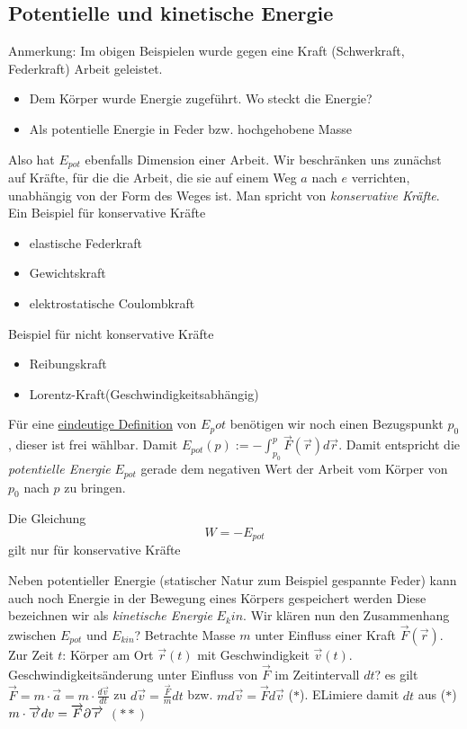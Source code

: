 \documentclass[a4paper,10pt]{scrartcl}
\begin{document}
\subsection{Potentielle und kinetische Energie}
Anmerkung: Im obigen Beispielen wurde gegen eine Kraft (Schwerkraft, Federkraft) Arbeit geleistet.
\begin{itemize}
 \item Dem Körper wurde Energie zugeführt. Wo steckt die Energie?
 \item Als potentielle Energie in Feder bzw. hochgehobene Masse
\end{itemize}
Also hat $E_{pot}$ ebenfalls Dimension einer Arbeit. Wir beschränken uns zunächst auf Kräfte, für die die Arbeit, die sie auf einem Weg $a$ nach $e$ verrichten, 
unabhängig von der Form des Weges ist. Man spricht von \emph{konservative Kräfte}.\\
Ein Beispiel für konservative Kräfte\\
\begin{itemize}
 \item elastische Federkraft
 \item Gewichtskraft
 \item elektrostatische Coulombkraft
\end{itemize}
Beispiel für nicht  konservative Kräfte\\
\begin{itemize}
 \item Reibungskraft
 \item Lorentz-Kraft(Geschwindigkeitsabhängig)
\end{itemize}
Für eine \underline{eindeutige Definition} von $E_pot$ benötigen wir noch einen Bezugspunkt $p_0$, dieser ist frei wählbar.
Damit $E_{pot}(p):= -\int_{p_0}^{p} \vec F(\vec r)d\vec{r}$.
Damit entspricht die \emph{potentielle Energie} $E_{pot}$ gerade dem negativen Wert der Arbeit vom Körper von $p_0$ nach $p$ zu bringen.
\begin{att*}
 Die Gleichung
\[
 \boxed{W=-E_{pot}}
\]
gilt nur für konservative Kräfte
\end{att*}
Neben potentieller Energie (statischer Natur zum Beispiel gespannte Feder) kann auch noch Energie in der Bewegung eines Körpers gespeichert werden
Diese bezeichnen wir als \emph{kinetische Energie} $E_kin$. Wir klären nun den Zusammenhang zwischen $E_{pot}$ und $E_{kin}$?
Betrachte Masse $m$ unter Einfluss einer Kraft $\vec F(\vec r)$.\\
Zur Zeit $t$: Körper am Ort $\vec r(t)$ mit Geschwindigkeit $\vec v(t)$.
Geschwindigkeitsänderung unter Einfluss von $\vec F$ im Zeitintervall $dt$?
es gilt $\vec F=m\cdot \vec a=m\cdot \frac{d\vec{v}}{dt}$ zu $d\vec{v}=\frac{\vec F}{m} dt$ 
bzw. $md\vec v=\vec F d\vec{v}$ ($*$). ELimiere damit $dt$ aus ($*$) $m\cdot \overrightarrow{v} dv=\overrightarrow{F}\partial\overrightarrow{r}$ $(**)$
\end{document}
